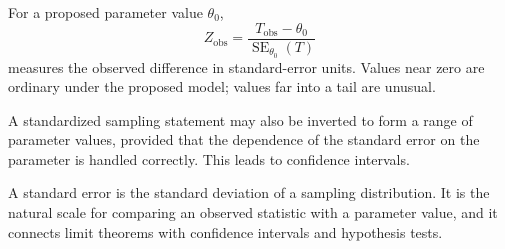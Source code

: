 For a proposed parameter value \(\theta_0\),
\[
Z_{\mathrm{obs}}
=
\frac{T_{\mathrm{obs}}-\theta_0}
{\operatorname{SE}_{\theta_0}(T)}
\]
measures the observed difference in standard-error units. Values near zero are
ordinary under the proposed model; values far into a tail are unusual.

A standardized sampling statement may also be inverted to form a range of
parameter values, provided that the dependence of the standard error on the
parameter is handled correctly. This leads to confidence intervals.

\begin{summarybox}
A standard error is the standard deviation of a sampling distribution. It is the
natural scale for comparing an observed statistic with a parameter value, and it
connects limit theorems with confidence intervals and hypothesis tests.
\end{summarybox}
